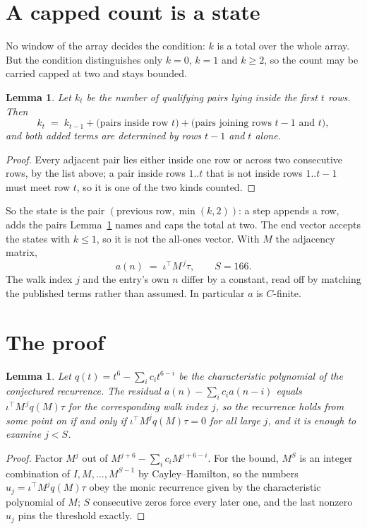 \documentclass[11pt,a4paper]{article}
\theoremstyle{plain}
\newtheorem{lemma}[theorem]{Lemma}
\theoremstyle{definition}
\begin{document}
\section{A capped count is a state}

No window of the array decides the condition: $k$ is a total over the whole array. But the
condition distinguishes only $k=0$, $k=1$ and $k\ge2$, so the count may be carried capped at
two and stays bounded.

\begin{lemma}\label{lem:cap}
Let $k_t$ be the number of qualifying pairs lying inside the first $t$ rows. Then
\[
k_{t}\;=\;k_{t-1}+\bigl(\text{pairs inside row } t\bigr)
+\bigl(\text{pairs joining rows } t-1 \text{ and } t\bigr),
\]
and both added terms are determined by rows $t-1$ and $t$ alone.
\end{lemma}

\begin{proof}
Every adjacent pair lies either inside one row or across two consecutive rows, by the list
above; a pair inside rows $1..t$ that is not inside rows $1..t-1$ must meet row $t$, so it is
one of the two kinds counted.
\end{proof}

So the state is the pair $(\text{previous row},\min(k,2))$: a step appends a row, adds the
pairs Lemma~\ref{lem:cap} names and caps the total at two. The end vector accepts the states
with $k\le1$, so it is not the all-ones vector. With $M$ the adjacency matrix,
\[
a(n)\;=\;\iota^{\!\top}M^{\,j}\tau ,\qquad S=166.
\]
The walk index $j$ and the entry's own $n$ differ by a constant, read off by matching the
published terms rather than assumed. In particular $a$ is $C$-finite.

\section{The proof}

\begin{lemma}\label{lem:crit}
Let $q(t)=t^{6}-\sum_i c_it^{6-i}$ be the characteristic polynomial of the
conjectured recurrence. The residual $a(n)-\sum_ic_ia(n-i)$ equals
$\iota^{\!\top}M^{\,j}q(M)\tau$ for the corresponding walk index $j$, so the recurrence
holds from some point on if and only if $\iota^{\!\top}M^{j}q(M)\tau=0$ for all large $j$,
and it is enough to examine $j<S$.
\end{lemma}

\begin{proof}
Factor $M^{j}$ out of $M^{j+6}-\sum_ic_iM^{j+6-i}$. For the bound, $M^{S}$
is an integer combination of $I,M,\dots,M^{S-1}$ by Cayley--Hamilton, so the numbers
$u_j=\iota^{\!\top}M^{j}q(M)\tau$ obey the monic recurrence given by the characteristic
polynomial of $M$; $S$ consecutive zeros force every later one, and the last nonzero $u_j$
pins the threshold exactly.
\end{proof}
\end{document}
